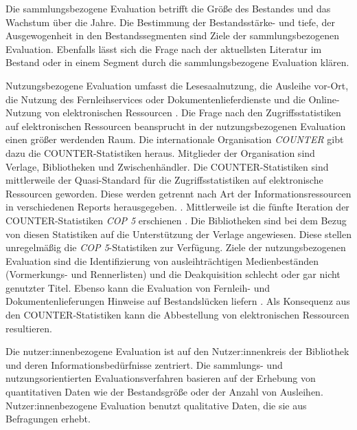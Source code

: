 Die sammlungsbezogene Evaluation betrifft die Größe des Bestandes und das Wachstum über die Jahre. Die Bestimmung der Bestandsstärke- und tiefe, 
der Ausgewogenheit in den Bestandssegmenten sind Ziele der sammlungsbezogenen Evaluation. 
Ebenfalls lässt sich die Frage nach der aktuellsten Literatur im Bestand oder in einem Segment durch die sammlungsbezogene Evaluation klären.

Nutzungsbezogene Evaluation umfasst die Lesesaalnutzung, die Ausleihe vor-Ort, die Nutzung des Fernleihservices oder Dokumentenlieferdienste und die Online-Nutzung von elektronischen Ressourcen \cite[vgl.][254 ff.]{johannsen_jochen_bestands-_2015}.
Die Frage nach den Zugriffsstatistiken auf elektronischen Ressourcen beansprucht in der nutzungsbezogenen Evaluation einen größer werdenden Raum.
Die internationale Organisation \textit{\acrfull{COUNTER}} gibt dazu die COUNTER-Statistiken heraus. Mitglieder der Organisation sind Verlage, Bibliotheken
und Zwischenhändler. Die COUNTER-Statistiken sind mittlerweile der Quasi-Standard für die Zugriffsstatistiken 
auf elektronische Ressourcen geworden. Diese werden getrennt nach Art der Informationsressourcen in verschiedenen Reports herausgegeben. \cite[vgl.][260 ff.]{johannsen_jochen_bestands-_2015}. 
Mittlerweile ist die fünfte Iteration der COUNTER-Statistiken \textit{\acrshort{COP 5}} erschienen \cite[vgl.][]{counter_abstract_2020}.
Die Bibliotheken sind bei dem Bezug von diesen Statistiken auf die Unterstützung der Verlage angewiesen. Diese stellen unregelmäßig die \textit{\acrshort{COP 5}}-Statistiken zur
Verfügung. Ziele der nutzungsbezogenen Evaluation sind die Identifizierung von ausleihträchtigen Medienbeständen (Vormerkungs- und Rennerlisten) und
die Deakquisition schlecht oder gar nicht genutzter Titel. Ebenso kann die Evaluation von Fernleih- und Dokumentenlieferungen Hinweise auf Bestandslücken liefern
\cite[vgl.][255 ff.]{johannsen_jochen_bestands-_2015}. Als Konsequenz aus den COUNTER-Statistiken kann die Abbestellung von elektronischen Ressourcen resultieren.

Die nutzer:innenbezogene Evaluation ist auf den Nutzer:innenkreis der Bibliothek und deren Informationsbedürfnisse zentriert. 
Die sammlungs- und nutzungsorientierten Evaluationsverfahren basieren auf der Erhebung von quantitativen Daten wie der Bestandsgröße oder der Anzahl von Ausleihen. 
Nutzer:innenbezogene Evaluation benutzt qualitative Daten, die sie aus Befragungen erhebt.

